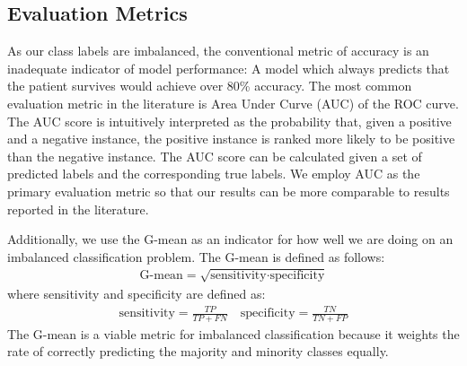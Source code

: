 \documentclass[review]{elsarticle}
\begin{document}
\subsection*{Evaluation Metrics}
As our class labels are imbalanced, the conventional metric of accuracy is an inadequate indicator of model performance: A model which always predicts that the patient survives would achieve over 80\% accuracy. The most common evaluation metric in the literature is Area Under Curve (AUC) of the ROC curve. The AUC score is intuitively interpreted as the probability that, given a positive and a negative instance, the positive instance is ranked more likely to be positive than the negative instance. The AUC score can be calculated given a set of predicted labels and the corresponding true labels. We employ AUC as the primary evaluation metric so that our results can be more comparable to results reported in the literature.

Additionally, we use the G-mean as an indicator for how well we are doing on an imbalanced classification problem. The G-mean is defined as follows:
\begin{align*}
	\text{G-mean} = \sqrt{\text{sensitivity}\cdot\text{specificity}}
\end{align*}
where sensitivity and specificity are defined as:
\begin{align*}
\text{sensitivity} = \frac{TP}{TP + FN} \quad\text{specificity} = \frac{TN}{TN + FP}
\end{align*}
 The G-mean is a viable metric for imbalanced classification because it weights the rate of correctly predicting the majority and minority classes equally.
\end{document}
